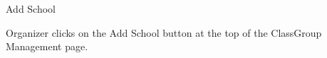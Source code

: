 
\begin{uc}{Add School}

    
    \begin{uc-trig}
        Organizer clicks on the Add School button at the top of the ClassGroup Management
        page.
    \end{uc-trig}
\end{uc}

